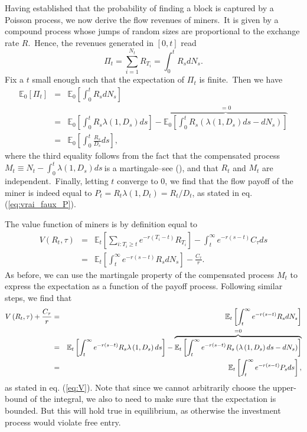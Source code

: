 \documentclass[12pt, a4paper]{article}
\begin{document}
Having established that the probability of finding a block is captured by a
Poisson process, we now derive the flow revenues of miners.\ It is given by
a compound process whose jumps of random sizes are proportional to the
exchange rate $R$.\ Hence, the revenues generated in $\left[ 0,t%
\right] $ read%
\begin{equation*}
\Pi _{t}=\sum_{i=1}^{N_{t}}R_{T_{i}}=\int_{0}^{t}R_{s}dN_{s}.
\end{equation*}
Fix a $t$ small enough such that the expectation of $\Pi _{t}$ is finite.\
Then we have%
\begin{eqnarray*}
\mathbb{E}_{0}\left[ \Pi _{t}\right]  &=&\mathbb{E}_{0}\left[
\int_{0}^{t}R_{s}dN_{s}\right]  \\
&=&\mathbb{E}_{0}\left[ \int_{0}^{t}R_{s}\lambda \left( 1,D_{s}\right) ds%
\right] -\overset{=0}{\overbrace{\mathbb{E}_{0}\left[ \int_{0}^{t}R_{s}%
\left( \lambda \left( 1,D_{s}\right) ds-dN_{s}\right) \right] }} \\
&=&\mathbb{E}_{0}\left[ \int_{0}^{t}\frac{R_{s}}{D_{s}}ds%
\right] ,
\end{eqnarray*}%
where the third equality follows from the fact that the compensated process $%
M_{t}\equiv N_{t}-\int_{0}^{t}\lambda \left( 1,D_{s}\right) ds\ $is a
martingale--see \citeauthor{Jeanblanc} (\citeyear{Jeanblanc}), and that $R_{t}$ and $M_{t}$ are independent.\ Finally, letting $%
t$ converge to $0$, we find that the flow payoff of the miner is indeed
equal to $P_{t}=R_{t}\lambda \left( 1,D_{t}\right) =R_{t}/D_{t}$, as stated in eq. (\ref{eq:vrai_faux_P}).

\bigskip

The value function of miners is by definition equal to%
\begin{eqnarray*}
V\left( R_{t},\tau \right)  &=&\mathbb{E}_{t}\left[ \sum_{i:T_{i}\geq
t}e^{-r\left( T_{i}-t\right) }R_{T_{i}}\right] -\int_{t}^{\infty
}e^{-r\left( s-t\right) }C_{\tau }ds \\
&=&\mathbb{E}_{t}\left[ \int_{t}^{\infty }e^{-r\left( s-t\right) }R_{s}dN_{s}%
\right] -\frac{C_{\tau}}{r}.
\end{eqnarray*}%
As before, we can use the martingale property of the compensated process $%
M_{t}$ to express the expectation as a function of the payoff process.
Following similar steps, we find that%
\begin{eqnarray*}
V\left( R_{t},\tau \right)+\frac{C_{\tau}}{r}  &=&\mathbb{E}_{t}\left[
\int_{t}^{\infty }e^{-r\left( s-t\right) }R_{s}dN_{s}\right]  \\
&=&\mathbb{E}_{t}\left[ \int_{t}^{\infty }e^{-r\left( s-t\right)
}R_{s}\lambda \left( 1,D_{s}\right) ds\right] -\overset{=0}{\overbrace{%
\mathbb{E}_{t}\left[ \int_{t}^{\infty }e^{-r\left( s-t\right) }R_{s}\left(
\lambda \left( 1,D_{s}\right) ds-dN_{s}\right) \right] }} \\
&=&\mathbb{E}_{t}\left[ \int_{t}^{\infty }e^{-r\left( s-t\right) }P_{s}ds%
\right] ,
\end{eqnarray*}%
as stated in eq. (\ref{eq:V}). Note that since we cannot arbitrarily choose
the upper-bound of the integral, we also to need to make sure that the
expectation is bounded. But this will hold true in equilibrium, as
otherwise the investment process would violate free entry.
\end{document}
